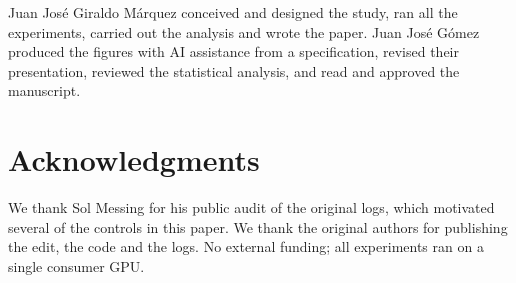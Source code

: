 \documentclass[11pt]{article}
\begin{document}
Juan José Giraldo Márquez conceived and designed the study, ran all the experiments, carried out the analysis and wrote the paper. Juan José Gómez produced the figures with AI assistance from a specification, revised their presentation, reviewed the statistical analysis, and read and approved the manuscript.

\section*{Acknowledgments}

We thank Sol Messing for his public audit of the original logs, which motivated several of the controls in this paper. We thank the original authors for publishing the edit, the code and the logs. No external funding; all experiments ran on a single consumer GPU.



\end{document}
